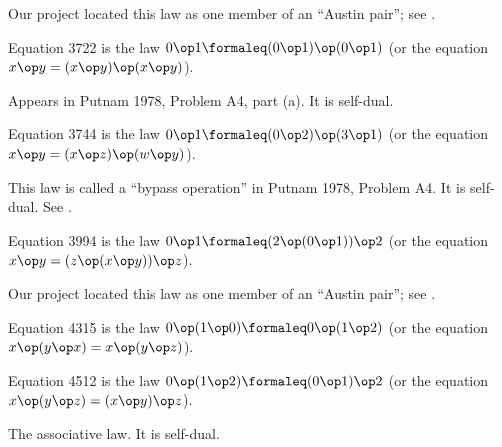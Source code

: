 Our project located this law as one member of an ``Austin pair''; see .

\begin{definition}[Equation 3722]\label{eq3722}\leanok{}  Equation 3722 is the law $0 \op 1  \formaleq  (0 \op 1) \op (0 \op 1)$ (or the equation $x \op y = (x \op y) \op (x \op y)$).
\end{definition}

Appears in Putnam 1978, Problem A4, part (a).  It is self-dual.

\begin{definition}[Equation 3744]\label{eq3744}\leanok{}  Equation 3744 is the law $0 \op 1  \formaleq  (0 \op 2) \op (3 \op 1)$ (or the equation $x \op y = (x \op z) \op (w \op y)$).
\end{definition}

This law is called a ``bypass operation'' in Putnam 1978, Problem A4. It is self-dual.  See .

\begin{definition}[Equation 3994]
  \label{eq3994}
  Equation 3994 is the law $0 \op 1 \formaleq (2 \op (0 \op 1)) \op 2$ (or the equation $x \op y = (z \op (x \op y)) \op z$).
\end{definition}

Our project located this law as one member of an ``Austin pair''; see .

\begin{definition}[Equation 4315]\label{eq4315}\leanok{}  Equation 4315 is the law $0 \op (1 \op 0)  \formaleq  0 \op (1 \op 2)$ (or the equation $x \op (y \op x) = x \op (y \op z)$).
\end{definition}

\begin{definition}[Equation 4512]\label{eq4512}\leanok{}  Equation 4512 is the law $0 \op (1 \op 2)  \formaleq  (0 \op 1) \op 2$ (or the equation $x \op (y \op z) = (x \op y) \op z$).
\end{definition}

The associative law. It is self-dual.

